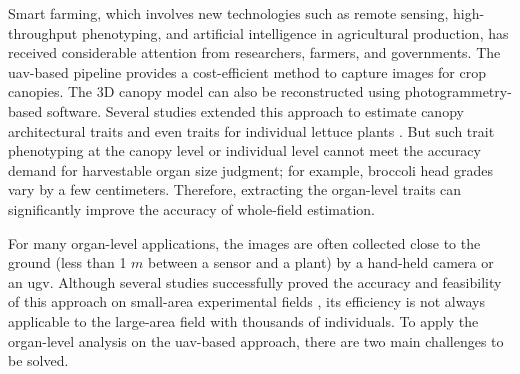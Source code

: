 
Smart farming, which involves new technologies such as remote sensing, high-throughput phenotyping, and artificial intelligence in agricultural production, has received considerable attention from researchers, farmers, and governments. The \gls{uav}-based pipeline provides a cost-efficient method to capture images for crop canopies. The 3D canopy model can also be reconstructed using photogrammetry-based software. Several studies extended this approach to estimate canopy architectural traits \citep{shu_application_2021, wang_detection_2021, herrero_canopy_2020} and even traits for individual lettuce plants \citep{bauer_combining_2019}. But such trait phenotyping at the canopy level or individual level cannot meet the accuracy demand for harvestable organ size judgment; for example, broccoli head grades vary by a few centimeters. Therefore, extracting the organ-level traits can significantly improve the accuracy of whole-field estimation.

For many organ-level applications, the images are often collected close to the ground (less than 1 $m$ between a sensor and a plant) by a hand-held camera or an \gls{ugv}. Although several studies successfully proved the accuracy and feasibility of this approach on small-area experimental fields \citep{luling_using_2021,garcia_towards_2021,blok_effect_2021}, its efficiency is not always applicable to the large-area field with thousands of individuals. To apply the organ-level analysis on the \gls{uav}-based approach, there are two main challenges to be solved.

